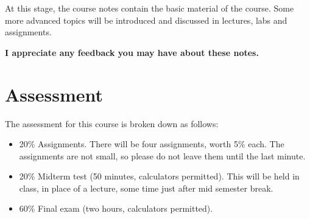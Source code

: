 At this stage, the course notes contain the basic material of the course. Some
more advanced topics will be introduced and discussed in lectures, labs and
assignments.

\begin{framed}
\begin{center}
{\bf 
I appreciate any feedback you may have about these notes.
}
\end{center}
\end{framed}

\section{Assessment}
The assessment for this course is broken down as follows:
\begin{itemize}
\item 20\% Assignments. There will be four assignments, worth 5\% each. The
assignments are not small, so please do not leave them until the last minute.
\item 20\% Midterm test (50 minutes, calculators permitted). This will be held
in class, in place of a lecture, some time just after mid semester break.
\item 60\% Final exam (two hours, calculators permitted).
\end{itemize}

